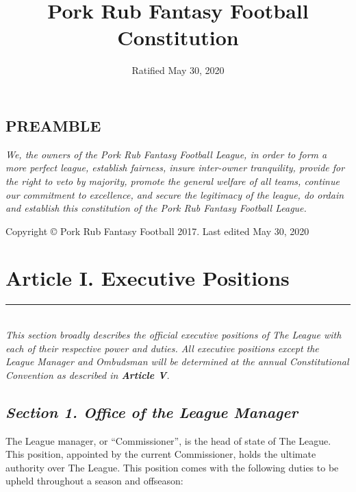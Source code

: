\documentclass{article}
\title{Pork Rub Fantasy Football Constitution}
\date{Ratified May 30, 2020}
\begin{document}
\begin{titlepage}
    \maketitle
\end{titlepage}
\begin{center}
    \section*{PREAMBLE}
\end{center}

\textit{We, the owners of the Pork Rub Fantasy Football League, in order to form a more perfect league, establish fairness, insure inter-owner tranquility, provide for the right to veto by majority, promote the general welfare of all teams, continue our commitment to excellence, and secure the legitimacy of the league, do ordain and establish this constitution of the Pork Rub Fantasy Football League.}

\newpage
\begin{center}
    Copyright \copyright{} Pork Rub Fantasy Football 2017. Last edited May 30, 2020
\end{center}

\newpage
\tableofcontents
\newpage
\section{Article I. Executive Positions}
    \noindent\rule{\textwidth}{0.5pt}\\

    \noindent\textit{This section broadly describes the official executive positions of The League with each of their respective power and duties. All executive positions except the League Manager and Ombudsman will be determined at the annual Constitutional Convention as described in \textbf{Article V}.}
    \subsection*{\textit{Section 1. Office of the League Manager}}
    The League manager, or “Commissioner”, is the head of state of The League. This position, appointed by the current Commissioner, holds the ultimate authority over The League. This position comes with the following duties to be upheld throughout a season and offseason:\\
\end{document}
